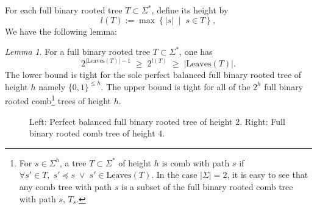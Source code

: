 \documentclass[11pt, a4paper, oneside]{article}
\theoremstyle{remark}
\theoremstyle{lemma}
\newtheorem*{lemma}{Lemma}
\begin{document}
For each full binary rooted tree \(T\subset \Sigma^{*}\), define its height by
\[
l(T) := \max \left\{ |s| \;\middle|\; s \in T \right\},
\]
We have the following lemma:
\begin{lemma}
For a full binary rooted tree \(T \subset \Sigma^{*}\), one has
\[
2^{|\mathrm{Leaves}(T)|-1} \;\geq\; 2^{l(T)} \;\geq\; |\mathrm{Leaves}(T)|.
\]
The lower bound is tight for the sole perfect balanced full binary rooted tree of height \(h\) namely \(\{0,1\}^{\leq h}\). The upper bound is tight for all of the \(2^{h}\) full binary rooted comb\footnote{For \(s \in \Sigma^{h}\), a tree \(T\subset \Sigma^{*}\) of height $h$ is comb with path \(s\) if \(\forall s' \in T, \; s' \preceq s \; \vee \; s' \in \mathrm{Leaves}(T)\). In the case \(|\Sigma|=2\), it is easy to see that any comb tree with path \(s\) is a subset of the full binary rooted comb tree with path \(s\), \(T_s\).} trees of height \(h\).
\begin{figure}[h]
\centering
\quad
\caption{Left: Perfect balanced full binary rooted tree of height \(2\). Right: Full binary rooted comb tree of height \(4\).}
\end{figure}
\end{lemma}
\end{document}
